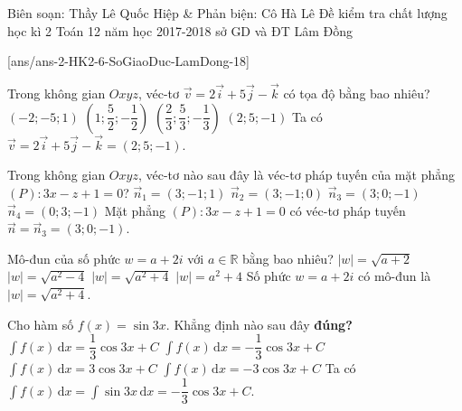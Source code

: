 
\begin{name}
{Biên soạn: Thầy Lê Quốc Hiệp \& Phản biện: Cô Hà Lê}
{Đề kiểm tra chất lượng học kì 2 Toán 12 năm học 2017-2018 sở GD và ĐT Lâm Đồng}
\end{name}
\setcounter{ex}{0}\setcounter{bt}{0}
[ans/ans-2-HK2-6-SoGiaoDuc-LamDong-18]

\begin{ex}%
	Trong không gian $Oxyz$, véc-tơ $\vec{v}=2\vec{i}+5\vec{j}-\vec{k}$ có tọa độ bằng bao nhiêu?
	\choice
	{$(-2;-5;1)$}
	{$\left(1;\dfrac{5}{2};-\dfrac{1}{2}\right)$}
	{$\left(\dfrac{2}{3};\dfrac{5}{3};-\dfrac{1}{3}\right)$}
	{\True $(2;5;-1)$}
	\loigiai
	{
		Ta có $\vec{v}=2\vec{i}+5\vec{j}-\vec{k}=(2;5;-1)$.
	}
\end{ex} 

\begin{ex}%
	Trong không gian $Oxyz$, véc-tơ nào sau đây là véc-tơ pháp tuyến của mặt phẳng $(P)\colon3x-z+1=0$?
	\choice
	{$\vec{n}_1=(3;-1;1)$}
	{$\vec{n}_2=(3;-1;0)$}
	{\True $\vec{n}_3=(3;0;-1)$}
	{$\vec{n}_4=(0;3;-1)$}
	\loigiai
	{
		Mặt phẳng $(P)\colon3x-z+1=0$ có véc-tơ pháp tuyến $\vec{n}=\vec{n}_3=(3;0;-1)$.
	}
\end{ex}

\begin{ex}%
	Mô-đun của số phức $w=a+2i$ với $a\in\mathbb{R}$ bằng bao nhiêu?
	\choice
	{$|w|=\sqrt{a+2}$}
	{$|w|=\sqrt{a^2-4}$}
	{\True $|w|=\sqrt{a^2+4}$}
	{$|w|=a^2+4$}
	\loigiai
	{
		Số phức $w=a+2i$ có mô-đun là $|w|=\sqrt{a^2+4}$.
	}
\end{ex}

\begin{ex}%
	Cho hàm số $f(x)=\sin 3x$. Khẳng định nào sau đây \textbf{đúng?}
	\choice
	{$\displaystyle\int\limits f(x)\mathrm{\,d}x=\dfrac{1}{3}\cos 3x+C$}
	{\True $\displaystyle\int\limits f(x)\mathrm{\,d}x=-\dfrac{1}{3}\cos 3x+C$}
	{$\displaystyle\int\limits f(x)\mathrm{\,d}x=3\cos 3x+C$}
	{$\displaystyle\int\limits f(x)\mathrm{\,d}x=-3\cos 3x+C$}
	\loigiai
	{
		Ta có $\displaystyle\int\limits f(x)\mathrm{\,d}x=\displaystyle\int\limits \sin 3x\mathrm{\,d}x=-\dfrac{1}{3}\cos 3x+C$.
	}
\end{ex}

